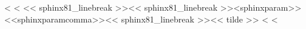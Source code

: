 \documentclass[letterpaper,10pt,english]{sphinxmanual}
\begin{document}
\vspace{5px}

\begin{fulllineitems}
\label{\detokenize{index:foo}}
<%
\pysigstartsignatures
<%
\pysiglinewithargsret<< sphinx81_linebreak >>{}<< sphinx81_linebreak >>{\<<sphinxparam>>{}<<sphinxparamcomma>>{}}<< sphinx81_linebreak >>{}<< tilde >>
<%
\pysigstopsignatures
<%
\vspace{10px}\begin{flushleft}\end{flushleft}\vspace{10px}

\end{fulllineitems}



\vspace{10px}




\vspace{-5px}
\end{document}

